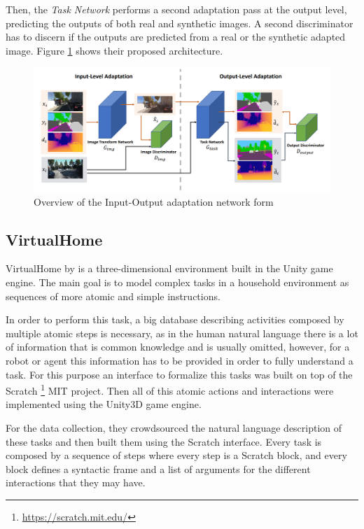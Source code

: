 \begin{itemize}
	Then, the \textit{Task Network} performs a second adaptation pass at the output level, predicting the outputs of both real and synthetic images. A second discriminator has to discern if the outputs are predicted from a real or the synthetic adapted image. Figure \ref{fig:gan} shows their proposed architecture.
	
	\begin{figure}
		\centering
		\includegraphics[width=\linewidth]{archivos/gan}
		\caption{Overview of the Input-Output adaptation network form \cite{DBLP:journals/corr/abs-1812-05040}}
		\label{fig:gan}
	\end{figure}
 
\end{itemize}

\subsection{VirtualHome}
VirtualHome by \cite{virtualhome2018} is a three-dimensional environment built in the Unity game engine. The main goal is to model complex tasks in a household environment as sequences of more atomic and simple instructions.
 
In order to perform this task, a big database describing activities composed by multiple atomic steps is necessary, as in the human natural language there is a lot of information that is common knowledge and is usually omitted, however, for a robot or agent this information has to be provided in order to fully understand a task. For this purpose an interface to formalize this tasks was built on top of the Scratch \footnote{\url{https://scratch.mit.edu/}} MIT project. Then all of this atomic actions and interactions were implemented using the Unity3D game engine.

For the data collection, they crowdsourced the natural language description of these tasks and then built them using the Scratch interface. Every task is composed by a sequence of steps where every step is a Scratch block, and every block defines a syntactic frame and a list of arguments for the different interactions that they may have.

